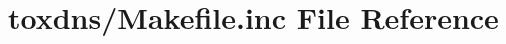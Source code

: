 \hypertarget{toxdns_2_makefile_8inc}{\section{toxdns/\+Makefile.inc File Reference}
\label{toxdns_2_makefile_8inc}
}
